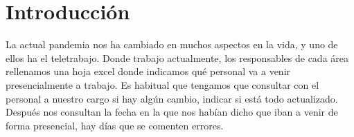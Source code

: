 \documentclass[11pt,spanish,listoffigures,listoftables]{tfgetsinf}
\begin{document}
\pagebreak

\begin{abstract}[english]
Telework Shift Manager is a tool to organize shifts in which the personnel of the different departments of a company takes turns to telework.

For the basic client, a calendar is offered where you can confirm the shifts that are assigned to you or request a change from another colleague.

You also have visibility on the shifts in your area to be able to request the change.

You can also get a copy of the calendar in pdf to print it later or store it.

The department manager can obtain a report with graphs of the people he manages and obtain a list of dates and users working in person.

The application manager has an interface to be able to modify the application settings and obtain a list of dates and users working in person.

The application can be deployed in the google cloud, so it can be accessed from any location, without the need to invest in dedicated infrastructure.
\end{abstract}


\mainmatter


\chapter{Introducci\'on}
La actual pandemia nos ha cambiado en muchos aspectos en la vida, y uno de ellos ha el teletrabajo. Donde trabajo actualmente, los responsables de cada área rellenamos una hoja excel donde indicamos qué personal va a venir presencialmente a trabajo.
Es habitual que tengamos que consultar con el personal a nuestro cargo si hay algún cambio, indicar si está todo actualizado. Después nos consultan la fecha en la que nos habían dicho que iban a venir de forma presencial, hay días que se comenten errores. 
\end{document}
